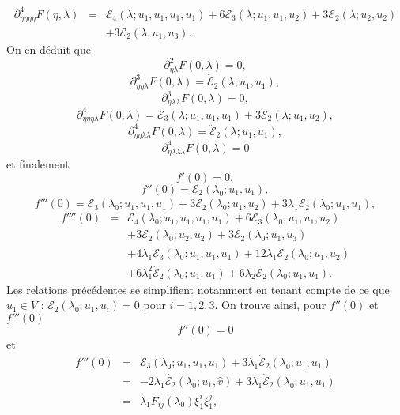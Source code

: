 \documentclass{article}
\begin{document}
\begin{eqnarray}
  \partial_{\eta  \eta  \eta  \eta}^4 F (\eta,
  λ) & = & \mathcal{E}_4 (λ ; u_1, u_1, u_1, u_1) + 6\mathcal{E}_3
  (λ ; u_1, u_1, u_2) + 3\mathcal{E}_2 (λ ; u_2, u_2) \nonumber\\
  &  &  + 3\mathcal{E}_2 (λ ; u_1, u_3) . \nonumber
\end{eqnarray}
On en déduit que
\[ \partial_{\eta  λ}^2 F (0, λ) = 0, \]
\[ \partial_{\eta  \eta  λ}^3 F (0, λ) =
   \dot{\mathcal{E}}_2 (λ ; u_1, u_1), \]
\[ \partial_{\eta  λ  λ}^3 F (0, λ) = 0, \]
\[ \partial_{\eta  \eta  \eta  λ}^4 F (0,
   λ) = \dot{\mathcal{E}}_3 (λ ; u_1, u_1, u_1) + 3
   \dot{\mathcal{E}}_2 (λ ; u_1, u_2), \text{} \text{} \]
\[ \partial_{\eta  \eta  λ  λ}^4 F (0,
   λ) = \ddot{\mathcal{E}}_2 (λ ; u_1, u_1), \]
\[ \partial_{\eta  λ  λ  λ}^4 F (0,
   λ) = 0 \]
et finalement
\[ f' (0) = 0, \]
\[ f'' (0) =\mathcal{E}_2 (λ_0 ; u_1, u_1), \]
\[ f''' (0) =\mathcal{E}_3 (λ_0 ; u_1, u_1, u_1) + 3\mathcal{E}_2
   (λ_0 ; u_1, u_2) + 3 λ_1  \dot{\mathcal{E}}_2 (λ_0 ; u_1,
   u_1), \]
\begin{eqnarray}
  f'''' (0) & = & \mathcal{E}_4 (λ_0 ; u_1, u_1, u_1, u_1) +
  6\mathcal{E}_3 (λ_0 ; u_1, u_1, u_2) \nonumber\\
  &  &  + 3\mathcal{E}_2 (λ_0 ; u_2, u_2) + 3\mathcal{E}_2
  (λ_0 ; u_1, u_3) \nonumber\\
  &  &  + 4 λ_1  \dot{\mathcal{E}}_3 (λ_0 ; u_1, u_1,
  u_1) + 12 λ_1  \dot{\mathcal{E}}_2 (λ_0 ; u_1, u_2) \nonumber\\
  &  &  + 6 λ_1^2  \ddot{\mathcal{E}}_2 (λ_0 ; u_1, u_1)
  + 6 λ_2  \dot{\mathcal{E}}_2 (λ_0 ; u_1, u_1) . \nonumber
\end{eqnarray}
Les relations précédentes se simplifient notamment en tenant compte de
ce que $u_1∈V$ : $\mathcal{E}_2 (λ_0 ; u_1, u_i) = 0$ pour $i = 1,
2, 3$. On trouve ainsi, pour $f'' (0)$ et $f''' (0)$
\begin{equation}
  \label{eq:DL energie derivee 2nde} f'' (0) = 0
\end{equation}
et
\begin{eqnarray}
  f''' (0) & = & \mathcal{E}_3 (λ_0 ; u_1, u_1, u_1) + 3 λ_1
  \dot{\mathcal{E}}_2 (λ_0 ; u_1, u_1) \nonumber\\
  & = & - 2 λ_1  \dot{\mathcal{E}_2} (λ_0 ; u_1, \hat{v}) + 3
  λ_1  \dot{\mathcal{E}}_2 (λ_0 ; u_1, u_1) \nonumber\\
  & = & λ_1 F_{i  j} (λ_0) \xi_1^i \xi_1^j,  \label{eq:DL
  energie derivee 3ieme}
\end{eqnarray}
\end{document}
